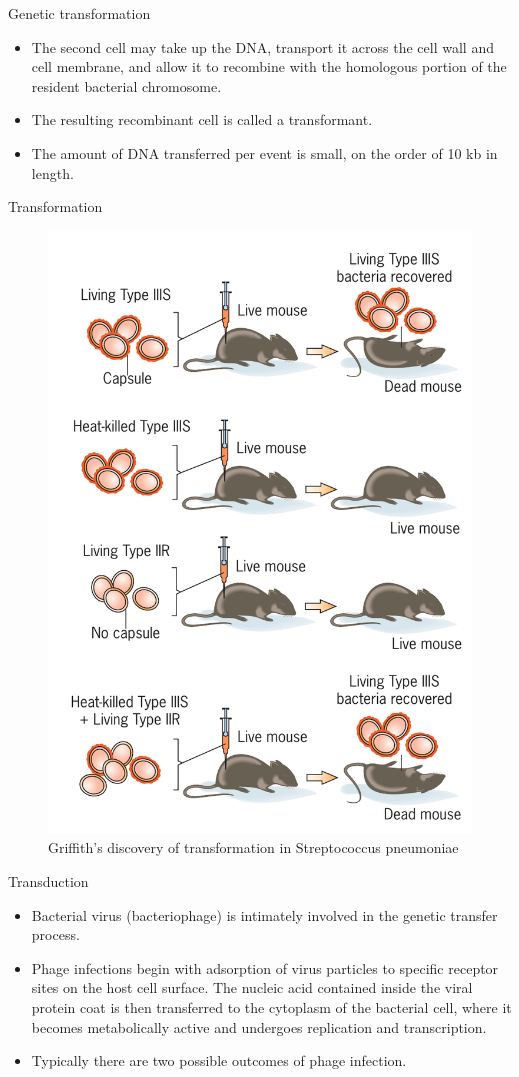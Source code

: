 \documentclass[ignorenonframetext,aspectratio=169]{beamer}
\providecommand{\tightlist}{%
  \setlength{\itemsep}{0pt}\setlength{\parskip}{0pt}}
\begin{document}
\begin{frame}{Genetic transformation}
\protect\hypertarget{genetic-transformation-1}{}

\begin{itemize}
\tightlist
\item
  The second cell may take up the DNA, transport it across the cell wall
  and cell membrane, and allow it to recombine with the homologous
  portion of the resident bacterial chromosome.
\item
  The resulting recombinant cell is called a transformant.
\item
  The amount of DNA transferred per event is small, on the order of 10
  kb in length.
\end{itemize}

\end{frame}

\begin{frame}{Transformation}
\protect\hypertarget{transformation}{}

\begin{figure}
\includegraphics[width=0.25\linewidth]{./../images/bacterial_transformation} \caption{Griffith's discovery of transformation in Streptococcus pneumoniae}\label{fig:transformation-griffith}
\end{figure}

\end{frame}

\begin{frame}{Transduction}
\protect\hypertarget{transduction}{}

\begin{itemize}
\tightlist
\item
  Bacterial virus (bacteriophage) is intimately involved in the genetic
  transfer process.
\item
  Phage infections begin with adsorption of virus particles to specific
  receptor sites on the host cell surface. The nucleic acid contained
  inside the viral protein coat is then transferred to the cytoplasm of
  the bacterial cell, where it becomes metabolically active and
  undergoes replication and transcription.
\item
  Typically there are two possible outcomes of phage infection.
\end{itemize}

\end{frame}
\end{document}
